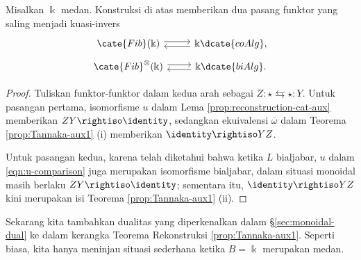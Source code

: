 \begin{theorem}\label{prop:Tannaka-reconstruction}
	Misalkan $\Bbbk$ medan. Konstruksi di atas memberikan dua pasang funktor
	yang saling menjadi kuasi-invers
	\[\begin{tikzcd}[row sep=tiny]
		\cate{Fib}(\Bbbk) \arrow[shift left, r] & \Bbbk\dcate{coAlg}, \arrow[shift left, l] \\
		\cate{Fib}^{\otimes}(\Bbbk) \arrow[shift left, r] & \Bbbk\dcate{biAlg}. \arrow[shift left, l]
	\end{tikzcd}\]
\end{theorem}
\begin{proof}
	Tuliskan funktor-funktor dalam kedua arah sebagai
	$Z: \star \leftrightarrows \star :Y$. Untuk pasangan pertama, isomorfisme
	$u$ dalam Lema \ref{prop:reconstruction-cat-aux} memberikan
	$ZY \rightiso \identity$, sedangkan ekuivalensi $\overline{\omega}$
	dalam Teorema \ref{prop:Tannaka-aux1} (i) memberikan
	$\identity \rightiso YZ$.
	
	Untuk pasangan kedua, karena telah diketahui bahwa ketika $L$ bialjabar,
	$u$ dalam \eqref{eqn:u-comparison} juga merupakan isomorfisme bialjabar,
	dalam situasi monoidal masih berlaku $ZY \rightiso \identity$; sementara
	itu, $\identity \rightiso YZ$ kini merupakan isi Teorema
	\ref{prop:Tannaka-aux1} (ii).
\end{proof}

Sekarang kita tambahkan dualitas yang diperkenalkan dalam
\S\ref{sec:monoidal-dual} ke dalam kerangka Teorema Rekonstruksi
\ref{prop:Tannaka-aux1}. Seperti biasa, kita hanya meninjau situasi sederhana
ketika $B = \Bbbk$ merupakan medan.

